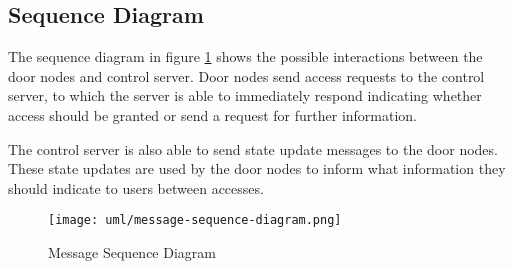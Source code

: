 \subsection{Sequence Diagram}

The sequence diagram in figure \ref{fig:message-sequence-diagram} shows the
possible interactions between the door nodes and control server. Door nodes send
access requests to the control server, to which the server is able to
immediately respond indicating whether access should be granted or send a
request for further information.

The control server is also able to send state update messages to the door nodes.
These state updates are used by the door nodes to inform what information they
should indicate to users between accesses.

\begin{figure}[!htb]
\centering
\texttt{[image: uml/message-sequence-diagram.png]}
\caption{Message Sequence Diagram}
\label{fig:message-sequence-diagram}
\end{figure}

